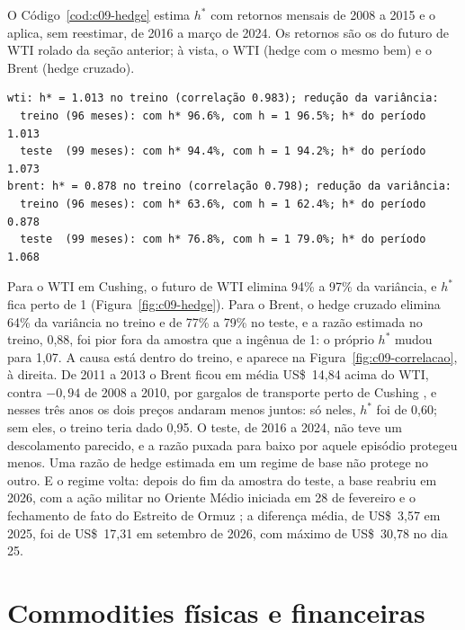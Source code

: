 O Código~\ref{cod:c09-hedge} estima $h^{\ast}$ com retornos mensais de 2008 a 2015 e o aplica, sem reestimar, de 2016 a março de 2024. Os retornos são os do futuro de WTI rolado da seção anterior; à vista, o WTI (hedge com o mesmo bem) e o Brent (hedge cruzado).


\begin{lstlisting}[style=saida]
wti: h* = 1.013 no treino (correlação 0.983); redução da variância:
  treino (96 meses): com h* 96.6%, com h = 1 96.5%; h* do período 1.013
  teste  (99 meses): com h* 94.4%, com h = 1 94.2%; h* do período 1.073
brent: h* = 0.878 no treino (correlação 0.798); redução da variância:
  treino (96 meses): com h* 63.6%, com h = 1 62.4%; h* do período 0.878
  teste  (99 meses): com h* 76.8%, com h = 1 79.0%; h* do período 1.068
\end{lstlisting}

Para o WTI em Cushing, o futuro de WTI elimina 94\% a 97\% da variância, e $h^{\ast}$ fica perto de 1 (Figura~\ref{fig:c09-hedge}). Para o Brent, o hedge cruzado elimina 64\% da variância no treino e de 77\% a 79\% no teste, e a razão estimada no treino, 0,88, foi pior fora da amostra que a ingênua de 1: o próprio $h^{\ast}$ mudou para 1,07. A causa está dentro do treino, e aparece na Figura~\ref{fig:c09-correlacao}, à direita. De 2011 a 2013 o Brent ficou em média US\$~14,84 acima do WTI, contra $-0,94$ de 2008 a 2010, por gargalos de transporte perto de Cushing \citep{eia2012}, e nesses três anos os dois preços andaram menos juntos: só neles, $h^{\ast}$ foi de 0,60; sem eles, o treino teria dado 0,95. O teste, de 2016 a 2024, não teve um descolamento parecido, e a razão puxada para baixo por aquele episódio protegeu menos. Uma razão de hedge estimada em um regime de base não protege no outro. E o regime volta: depois do fim da amostra do teste, a base reabriu em 2026, com a ação militar no Oriente Médio iniciada em 28 de fevereiro e o fechamento de fato do Estreito de Ormuz \citep{eia2026}; a diferença média, de US\$~3,57 em 2025, foi de US\$~17,31 em setembro de 2026, com máximo de US\$~30,78 no dia 25.

\section{Commodities físicas e financeiras}
\label{sec:c09-fisicas}

